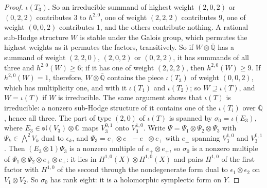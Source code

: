 \documentclass[11pt,reqno]{amsart}
\theoremstyle{plain}
\theoremstyle{definition}
\theoremstyle{remark}
\newcommand{\QQ}{\mathbb{Q}}
\newcommand{\CC}{\mathbb{C}}
\begin{document}
\begin{proof}
$\iota(T_{3})$. So an irreducible summand of highest weight $(2,0,2)$ or
$(0,2,2)$ contributes $3$ to $h^{2,0}$, one of weight $(2,2,2)$ contributes
$9$, one of weight $(0,0,2)$ contributes $1$, and the others contribute
nothing. A rational sub-Hodge structure $W$ is stable under the Galois group,
which permutes the highest weights as it permutes the factors, transitively.
So if $W\otimes\bar{\QQ}$ has a summand of weight $(2,2,0)$, $(2,0,2)$ or
$(0,2,2)$, it has summands of all three and $h^{2,0}(W)\ge6$; if it has one of
weight $(2,2,2)$, then $h^{2,0}(W)\ge9$. If $h^{2,0}(W)=1$, therefore,
$W\otimes\bar{\QQ}$ contains the piece $\iota(T_{3})$ of weight $(0,0,2)$,
which has multiplicity one, and with it $\iota(T_{1})$ and $\iota(T_{2})$; so
$W\supseteq\iota(T)$, and $W=\iota(T)$ if $W$ is irreducible. The same
argument shows that $\iota(T)$ is irreducible: a nonzero sub-Hodge structure
of it contains one of the $\iota(T_{i})$ over $\bar{\QQ}$, hence all three.
The part of type $(2,0)$ of $\iota(T)$ is spanned by $\sigma_{0}=\iota(E_{3})$,
where $E_{3}\in\mathfrak{sl}(V_{3})\otimes\CC$ maps $V_{3}^{0,1}$ onto
$V_{3}^{1,0}$. Write $\Psi=\Psi_{1}\otimes\Psi_{2}\otimes\Psi_{3}$ with
$\Psi_{k}\in\bigwedge^{2}V_{k}$ dual to $\epsilon_{k}$, and
$\Psi_{3}=e_{+}\otimes e_{-}-e_{-}\otimes e_{+}$ with $e_{\pm}$ spanning
$V_{3}^{1,0}$ and $V_{3}^{0,1}$. Then $(E_{3}\otimes1)\Psi_{3}$ is a nonzero
multiple of $e_{+}\otimes e_{+}$, so $\sigma_{0}$ is a nonzero multiple of
$\Psi_{1}\otimes\Psi_{2}\otimes e_{+}\otimes e_{+}$: it lies in
$H^{1,0}(X)\otimes H^{1,0}(X)$ and pairs $H^{1,0}$ of the first factor with
$H^{1,0}$ of the second through the nondegenerate form dual to
$\epsilon_{1}\otimes\epsilon_{2}$ on $V_{1}\otimes V_{2}$. So $\sigma_{0}$ has
rank eight: it is a holomorphic symplectic form on $Y$.


\end{proof}
\end{document}
